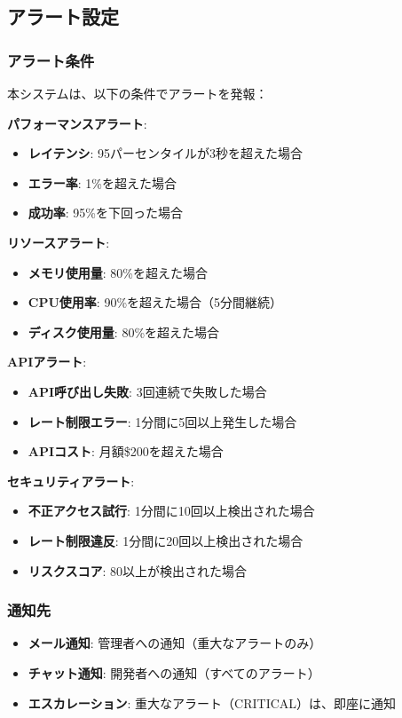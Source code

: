 \documentclass[a4paper,11pt,ja=standard,xelatex]{bxjsarticle}
\theoremstyle{definition}
\begin{document}
\subsection{アラート設定}

\subsubsection{アラート条件}

本システムは、以下の条件でアラートを発報：

\textbf{パフォーマンスアラート}:
\begin{itemize}
\item \textbf{レイテンシ}: 95パーセンタイルが3秒を超えた場合
\item \textbf{エラー率}: 1\%を超えた場合
\item \textbf{成功率}: 95\%を下回った場合
\end{itemize}

\textbf{リソースアラート}:
\begin{itemize}
\item \textbf{メモリ使用量}: 80\%を超えた場合
\item \textbf{CPU使用率}: 90\%を超えた場合（5分間継続）
\item \textbf{ディスク使用量}: 80\%を超えた場合
\end{itemize}

\textbf{APIアラート}:
\begin{itemize}
\item \textbf{API呼び出し失敗}: 3回連続で失敗した場合
\item \textbf{レート制限エラー}: 1分間に5回以上発生した場合
\item \textbf{APIコスト}: 月額\$200を超えた場合
\end{itemize}

\textbf{セキュリティアラート}:
\begin{itemize}
\item \textbf{不正アクセス試行}: 1分間に10回以上検出された場合
\item \textbf{レート制限違反}: 1分間に20回以上検出された場合
\item \textbf{リスクスコア}: 80以上が検出された場合
\end{itemize}

\subsubsection{通知先}

\begin{itemize}
\item \textbf{メール通知}: 管理者への通知（重大なアラートのみ）
\item \textbf{チャット通知}: 開発者への通知（すべてのアラート）
\item \textbf{エスカレーション}: 重大なアラート（CRITICAL）は、即座に通知
\end{itemize}
\end{document}
